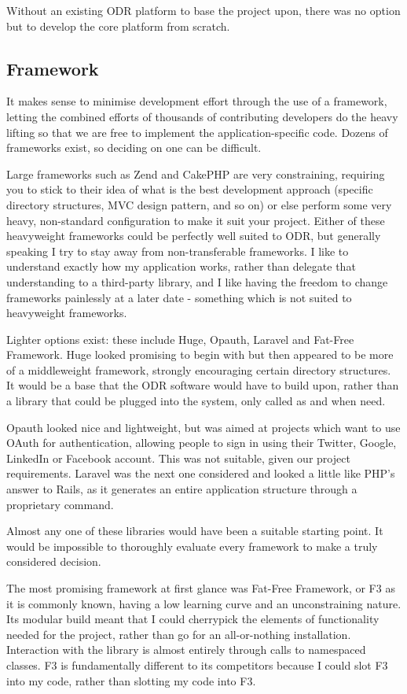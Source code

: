 Without an existing ODR platform to base the project upon, there was no option but to develop the core platform from scratch.

\subsection{Framework}

It makes sense to minimise development effort through the use of a framework, letting the combined efforts of thousands of contributing developers do the heavy lifting so that we are free to implement the application-specific code. Dozens of frameworks exist, so deciding on one can be difficult.

Large frameworks such as Zend and CakePHP are very constraining, requiring you to stick to their idea of what is the best development approach (specific directory structures, MVC design pattern, and so on) or else perform some very heavy, non-standard configuration to make it suit your project. Either of these heavyweight frameworks could be perfectly well suited to ODR, but generally speaking I try to stay away from non-transferable frameworks. I like to understand exactly how my application works, rather than delegate that understanding to a third-party library, and I like having the freedom to change frameworks painlessly at a later date - something which is not suited to heavyweight frameworks.

Lighter options exist: these include Huge, Opauth, Laravel and Fat-Free Framework. Huge looked promising to begin with but then appeared to be more of a middleweight framework, strongly encouraging certain directory structures. It would be a base that the ODR software would have to build upon, rather than a library that could be plugged into the system, only called as and when need.

Opauth looked nice and lightweight, but was aimed at projects which want to use OAuth for authentication, allowing people to sign in using their Twitter, Google, LinkedIn or Facebook account. This was not suitable, given our project requirements. Laravel was the next one considered and looked a little like PHP's answer to Rails, as it generates an entire application structure through a proprietary command.

Almost any one of these libraries would have been a suitable starting point. It would be impossible to thoroughly evaluate every framework to make a truly considered decision.

The most promising framework at first glance was Fat-Free Framework, or F3 as it is commonly known, having a low learning curve and an unconstraining nature. Its modular build meant that I could cherrypick the elements of functionality needed for the project, rather than go for an all-or-nothing installation. Interaction with the library is almost entirely through calls to namespaced classes. F3 is fundamentally different to its competitors because I could slot F3 into my code, rather than slotting my code into F3.

